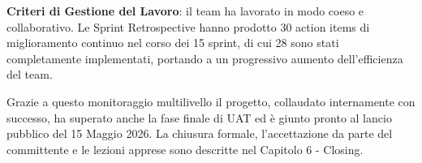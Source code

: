 \textbf{Criteri di Gestione del Lavoro}: il team ha lavorato in modo coeso e collaborativo. Le Sprint Retrospective hanno prodotto 30 action items di miglioramento continuo nel corso dei 15 sprint, di cui 28 sono stati completamente implementati, portando a un progressivo aumento dell'efficienza del team.

Grazie a questo monitoraggio multilivello il progetto, collaudato internamente con successo, ha superato anche la fase finale di UAT ed è giunto pronto al lancio pubblico del 15 Maggio 2026. La chiusura formale, l'accettazione da parte del committente e le lezioni apprese sono descritte nel Capitolo 6 - Closing.
